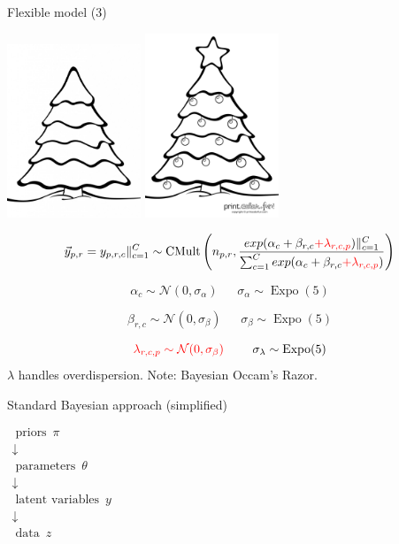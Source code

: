 \documentclass[
  ignorenonframetext,
]{beamer}
\begin{document}
\begin{frame}{Flexible model (3)}
\protect\hypertarget{flexible-model-3}{}

\includegraphics[width=0.3\textwidth,height=\textheight]{holidaytree_bare.jpg}
\includegraphics[width=0.3\textwidth,height=\textheight]{holidaytree_decorated.png}

\[\vec{y}_{p,r}=y_{p,r,c}\Vert_{c=1}^C\sim \operatorname{CMult}\left(n_{p,r},\frac{exp(\alpha_c+\beta_{r,c}\textcolor{red}{+\lambda_{r,c,p}})\Vert_{c=1}^C}{\sum_{c=1}^Cexp(\alpha_c+\beta_{r,c}\textcolor{red}{+\lambda_{r,c,p}})}\right)\]

\[\alpha_c\sim\mathcal{N}(0,\sigma_\alpha)~~~~~~~\sigma_\alpha\sim\operatorname{Expo}(5)\]

\[\beta_{r,c}\sim\mathcal{N}(0,\sigma_\beta)~~~~~~~\sigma_\beta\sim\operatorname{Expo}(5)\]

\[\textcolor{red}{\lambda_{r,c,p}\sim\mathcal{N}(0,\sigma_\beta)}~~~~~~~\sigma_\lambda\sim\operatorname{Expo}(5)\]
\(\lambda\) handles overdispersion. Note: Bayesian Occam's Razor.

\end{frame}

\begin{frame}{Standard Bayesian approach (simplified)}
\protect\hypertarget{standard-bayesian-approach-simplified}{}

\(\begin{array}{cl} \operatorname{priors}~\pi & \\ \downarrow & \\ \operatorname{parameters}~\theta & \\ \downarrow & \\ \operatorname{latent~variables}~y & \\ \downarrow & \\ \operatorname{data}~z & \end{array}\)

\end{frame}
\end{document}
